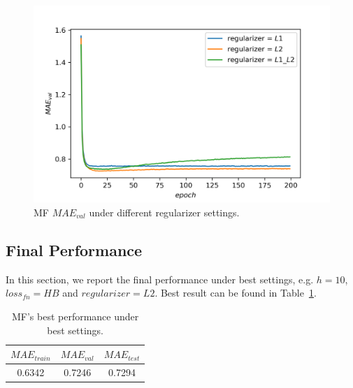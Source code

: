 \documentclass[journal, a4paper]{IEEEtran}
\begin{document}
\begin{figure}[!hbt]
	\begin{center}
		\includegraphics[width=\columnwidth]{reg_val_mae}
		\caption{MF $MAE_{val}$ under different regularizer settings.}
		\label{fig:reg_val_mae}
	\end{center}
\end{figure} \par

\subsection{Final Performance}
In this section, we report the final performance under best settings, e.g. $h = 10$, $loss_{fn} = HB$ and $regularizer = L2$. Best result can be found in Table~\ref{tab:final_performance}. \par
\begin{table}[!hbt]
	\begin{center}
		\caption{MF's best performance under best settings.}
		\label{tab:final_performance}
		\begin{tabular}{|c|c|c|}
			\hline
			$MAE_{train}$  & $MAE_{val}$ & $MAE_{test}$ \\
			\hline
		      0.6342 & 0.7246 & 0.7294\\
			\hline
		\end{tabular}
	\end{center}
\end{table} \par
\end{document}
